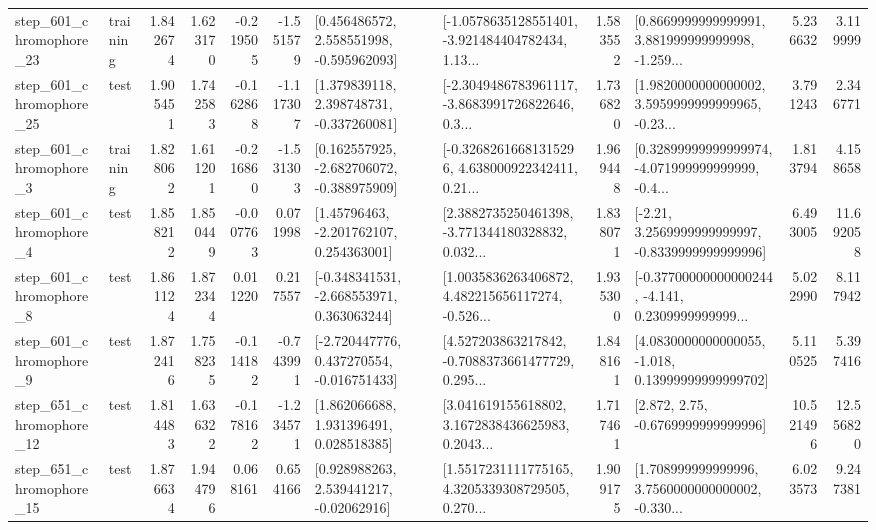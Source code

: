 \begin{tabular}{llrrrrllrlrr}
  step\_601\_chromophore\_23 &  training &      1.842674 &    1.623170 &     -0.219505 & -1.551579 &    [0.456486572, 2.558551998, -0.595962093] &  [-1.0578635128551401, -3.921484404782434, 1.13... &       1.583552 &  [0.8669999999999991, 3.881999999999998, -1.259... &            5.236632 &          3.119999 \\
  step\_601\_chromophore\_25 &      test &      1.905451 &    1.742583 &     -0.162868 & -1.117307 &    [1.379839118, 2.398748731, -0.337260081] &  [-2.3049486783961117, -3.8683991726822646, 0.3... &       1.736820 &  [1.9820000000000002, 3.5959999999999965, -0.23... &            3.791243 &          2.346771 \\
   step\_601\_chromophore\_3 &  training &      1.828062 &    1.611201 &     -0.216860 & -1.531303 &   [0.162557925, -2.682706072, -0.388975909] &  [-0.32682616681315296, 4.638000922342411, 0.21... &       1.969448 &  [0.32899999999999974, -4.071999999999999, -0.4... &            1.813794 &          4.158658 \\
   step\_601\_chromophore\_4 &      test &      1.858212 &    1.850449 &     -0.007763 &  0.071998 &     [1.45796463, -2.201762107, 0.254363001] &  [2.3882735250461398, -3.771344180328832, 0.032... &       1.838071 &   [-2.21, 3.2569999999999997, -0.8339999999999996] &            6.493005 &         11.692058 \\
   step\_601\_chromophore\_8 &      test &      1.861124 &    1.872344 &      0.011220 &  0.217557 &   [-0.348341531, -2.668553971, 0.363063244] &  [1.0035836263406872, 4.482215656117274, -0.526... &       1.935300 &  [-0.37700000000000244, -4.141, 0.2309999999999... &            5.022990 &          8.117942 \\
   step\_601\_chromophore\_9 &      test &      1.872416 &    1.758235 &     -0.114182 & -0.743991 &   [-2.720447776, 0.437270554, -0.016751433] &  [4.527203863217842, -0.7088373661477729, 0.295... &       1.848161 &  [4.0830000000000055, -1.018, 0.13999999999999702] &            5.110525 &          5.397416 \\
  step\_651\_chromophore\_12 &      test &      1.814483 &    1.636322 &     -0.178162 & -1.234571 &     [1.862066688, 1.931396491, 0.028518385] &  [3.041619155618802, 3.1672838436625983, 0.2043... &       1.717461 &                 [2.872, 2.75, -0.6769999999999996] &           10.521496 &         12.556820 \\
  step\_651\_chromophore\_15 &      test &      1.876634 &    1.944796 &      0.068161 &  0.654166 &     [0.928988263, 2.539441217, -0.02062916] &  [1.5517231111775165, 4.3205339308729505, 0.270... &       1.909175 &  [1.708999999999996, 3.7560000000000002, -0.330... &            6.023573 &          9.247381 \\

\end{tabular}
